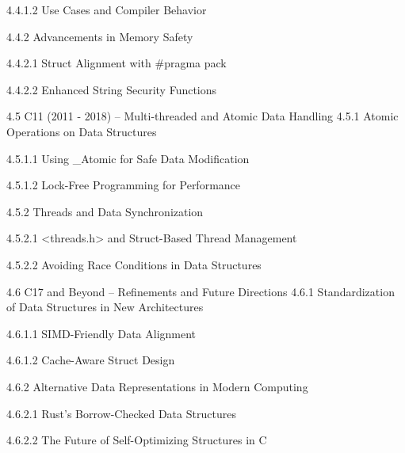 4.4.1.2 Use Cases and Compiler Behavior

4.4.2 Advancements in Memory Safety

4.4.2.1 Struct Alignment with #pragma pack

4.4.2.2 Enhanced String Security Functions

4.5 C11 (2011 - 2018) – Multi-threaded and Atomic Data Handling
4.5.1 Atomic Operations on Data Structures

4.5.1.1 Using _Atomic for Safe Data Modification

4.5.1.2 Lock-Free Programming for Performance

4.5.2 Threads and Data Synchronization

4.5.2.1 <threads.h> and Struct-Based Thread Management

4.5.2.2 Avoiding Race Conditions in Data Structures

4.6 C17 and Beyond – Refinements and Future Directions
4.6.1 Standardization of Data Structures in New Architectures

4.6.1.1 SIMD-Friendly Data Alignment

4.6.1.2 Cache-Aware Struct Design

4.6.2 Alternative Data Representations in Modern Computing

4.6.2.1 Rust’s Borrow-Checked Data Structures

4.6.2.2 The Future of Self-Optimizing Structures in C
